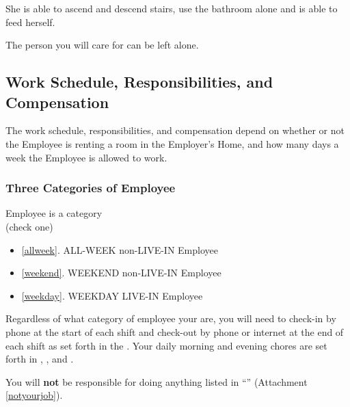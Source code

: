 \documentclass[]{article}
\newcommand{\checkbox}{\raisebox{2pt}{\framebox[12pt][c]{\rule[7pt]{0pt}{-.3\baselineskip}}}}
\newcommand{\allweek}{ALL-WEEK non-LIVE-IN Employee}
\newcommand{\weekend}{WEEKEND non-LIVE-IN Employee}
\newcommand{\weekday}{WEEKDAY LIVE-IN Employee}
\begin{document}


She is able to ascend and descend stairs, use the bathroom alone and is able to feed herself.

The person you will care for can be left alone.

\subsection*{Work Schedule, Responsibilities, and Compensation}
The work schedule, responsibilities, and compensation depend on whether or not the Employee is renting a room in the Employer's Home, and how many days a week the Employee is allowed to work.
\subsubsection*{Three Categories of Employee}

\noindent Employee is a category\\
\noindent(check one)
\begin{itemize}
	\item[\checkbox] \ref{allweek}. \allweek{}
	\item[\checkbox] \ref{weekend}. \weekend{}
	\item[\checkbox] \ref{weekday}. \weekday{}
\end{itemize}

Regardless of what category of employee your are, you will need to check-in by phone at the start of each shift and check-out by phone or internet at the end of each shift as set forth in the . Your daily morning and evening chores are set forth in \basic{}, \bathroom{}, and \shopping{}. 

You will \textbf{not} be responsible for doing anything listed in ``\notyourjob{}'' (Attachment \ref{notyourjob}). 
\end{document}
